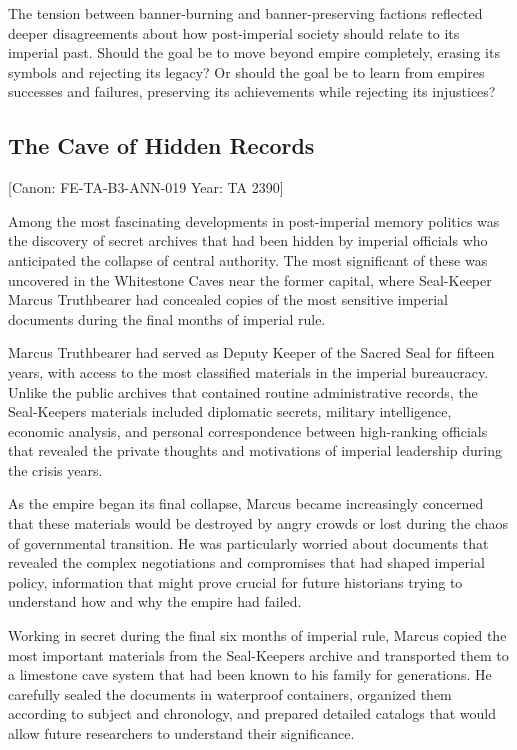 The tension between banner-burning and banner-preserving factions
reflected deeper disagreements about how post-imperial society should
relate to its imperial past. Should the goal be to move beyond empire
completely, erasing its symbols and rejecting its legacy? Or should the
goal be to learn from empire\textquotesingle s successes and failures,
preserving its achievements while rejecting its injustices?

\subsection{The Cave of Hidden
Records}\label{the-cave-of-hidden-records}

{[}Canon: FE-TA-B3-ANN-019 \textbar{} Year: TA 2390{]}

Among the most fascinating developments in post-imperial memory politics
was the discovery of secret archives that had been hidden by imperial
officials who anticipated the collapse of central authority. The most
significant of these was uncovered in the Whitestone Caves near the
former capital, where Seal-Keeper Marcus Truthbearer had concealed
copies of the most sensitive imperial documents during the final months
of imperial rule.

Marcus Truthbearer had served as Deputy Keeper of the Sacred Seal for
fifteen years, with access to the most classified materials in the
imperial bureaucracy. Unlike the public archives that contained routine
administrative records, the Seal-Keeper\textquotesingle s materials
included diplomatic secrets, military intelligence, economic analysis,
and personal correspondence between high-ranking officials that revealed
the private thoughts and motivations of imperial leadership during the
crisis years.

As the empire began its final collapse, Marcus became increasingly
concerned that these materials would be destroyed by angry crowds or
lost during the chaos of governmental transition. He was particularly
worried about documents that revealed the complex negotiations and
compromises that had shaped imperial policy, information that might
prove crucial for future historians trying to understand how and why the
empire had failed.

Working in secret during the final six months of imperial rule, Marcus
copied the most important materials from the
Seal-Keeper\textquotesingle s archive and transported them to a
limestone cave system that had been known to his family for generations.
He carefully sealed the documents in waterproof containers, organized
them according to subject and chronology, and prepared detailed catalogs
that would allow future researchers to understand their significance.

